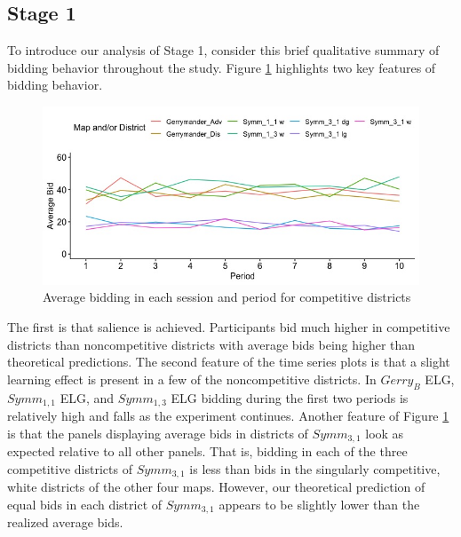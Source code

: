 \documentclass[AER]{AEA}
\begin{document}
\subsection{Stage 1}
\label{subsection:Stage_1}

To introduce our analysis of Stage 1, consider this brief qualitative summary of bidding behavior throughout the study. Figure \ref{fig:full_bidding_time_series} highlights two key features of bidding behavior. 
\begin{figure}[h]
\centering
\includegraphics[scale=0.5]{full_bidding_ts_one_to_ten}
\caption{Average bidding in each session and period for competitive districts}
\label{fig:full_bidding_time_series}
\end{figure}
The first is that salience is achieved. Participants bid much higher in competitive districts than noncompetitive districts with average bids being higher than theoretical predictions. The second feature of the time series plots is that a slight learning effect is present in a few of the noncompetitive districts. In $Gerry_B$ ELG, $Symm_{1,1}$ ELG, and $Symm_{1,3}$ ELG bidding during the first two periods is relatively high and falls as the experiment continues. Another feature of Figure \ref{fig:full_bidding_time_series} is that the panels displaying average bids in districts of $Symm_{3,1}$ look as expected relative to all other panels. That is, bidding in each of the three competitive districts of $Symm_{3,1}$ is less than bids in the singularly competitive, white districts of the other four maps. However, our theoretical prediction of equal bids in each district of $Symm_{3,1}$ appears to be slightly lower than the realized average bids.
\end{document}
